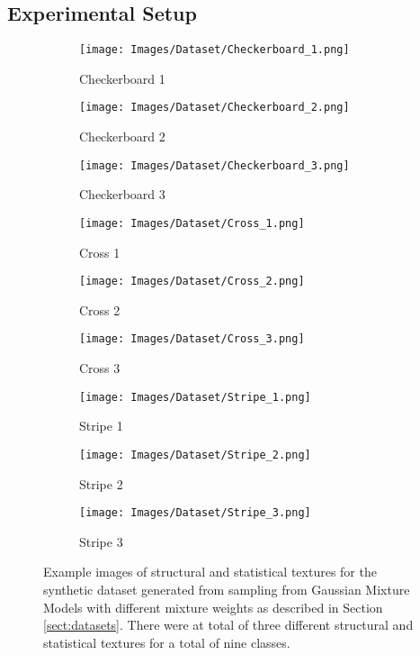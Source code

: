 \documentclass[journal]{IEEEtai}
\begin{document}
	\subsection{Experimental Setup}
	\begin{figure}[t]
    \centering
	\begin{subfigure}{.15\textwidth}{
			\texttt{[image: Images/Dataset/Checkerboard\_1.png]}
			\caption{Checkerboard 1}
			\label{fig:dist_1A}
		}
	\end{subfigure}
   \centering
	\begin{subfigure}{.15\textwidth}{
			\texttt{[image: Images/Dataset/Checkerboard\_2.png]}
			\caption{Checkerboard 2}
			\label{fig:dist_1B}
		}
	\end{subfigure}
   \centering
	\begin{subfigure}{.15\textwidth}{
			\texttt{[image: Images/Dataset/Checkerboard\_3.png]}
			\caption{Checkerboard 3}
			\label{fig:dist_1C}
		}
	\end{subfigure}
\centering
	\begin{subfigure}{.15\textwidth}{
			\texttt{[image: Images/Dataset/Cross\_1.png]}
			\caption{Cross 1}
			\label{fig:dist_2A}
		}
	\end{subfigure}
   \centering
	\begin{subfigure}{.15\textwidth}{
			\texttt{[image: Images/Dataset/Cross\_2.png]}
			\caption{Cross 2}
			\label{fig:dist_2B}
		}
	\end{subfigure}
   \centering
	\begin{subfigure}{.15\textwidth}{
			\texttt{[image: Images/Dataset/Cross\_3.png]}
			\caption{Cross 3}
			\label{fig:dist_2C}
		}
	\end{subfigure}
\centering
	\begin{subfigure}{.15\textwidth}{
			\texttt{[image: Images/Dataset/Stripe\_1.png]}
			\caption{Stripe 1}
			\label{fig:dist_3A}
		}
	\end{subfigure}
   \centering
	\begin{subfigure}{.15\textwidth}{
			\texttt{[image: Images/Dataset/Stripe\_2.png]}
			\caption{Stripe 2}
			\label{fig:dist_3B}
		}
	\end{subfigure}
   \centering
	\begin{subfigure}{.15\textwidth}{
			\texttt{[image: Images/Dataset/Stripe\_3.png]}
			\caption{Stripe 3}
			\label{fig:dist_3C}
		}
	\end{subfigure}
	\caption{Example images of structural and statistical textures for the synthetic dataset generated from sampling from Gaussian Mixture Models with different mixture weights as described in Section \mbox{\ref{sect:datasets}}. There were at total of three different structural and statistical textures for a total of nine classes.}
	\label{fig:Toy_Set} 
\end{figure}
\end{document}
